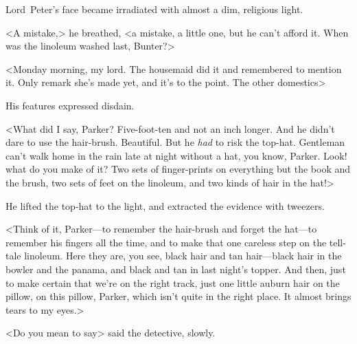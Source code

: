 Lord~Peter's face became irradiated with almost a dim, religious light.

<A mistake,> he breathed, <a mistake, a little one, but he can't afford it. When was the linoleum washed last, Bunter?>

<Monday morning, my lord. The housemaid did it and remembered to mention it. Only remark she's made yet, and it's to the point. The other domestics\longdash>

His features expressed disdain.

<What did I say, Parker? Five-foot-ten and not an inch longer. And he didn't dare to use the hair-brush. Beautiful. But he \emph{had} to risk the top-hat. Gentleman can't walk home in the rain late at night without a hat, you know, Parker. Look! what do you make of it? Two sets of finger-prints on everything but the book and the brush, two sets of feet on the linoleum, and two kinds of hair in the hat!>

He lifted the top-hat to the light, and extracted the evidence with tweezers.

<Think of it, Parker—to remember the hair-brush and forget the hat—to remember his fingers all the time, and to make that one careless step on the tell-tale linoleum. Here they are, you see, black hair and tan hair—black hair in the bowler and the panama, and black and tan in last night's topper. And then, just to make certain that we're on the right track, just one little auburn hair on the pillow, on this pillow, Parker, which isn't quite in the right place. It almost brings tears to my eyes.>

<Do you mean to say\longdash> said the detective, slowly.

